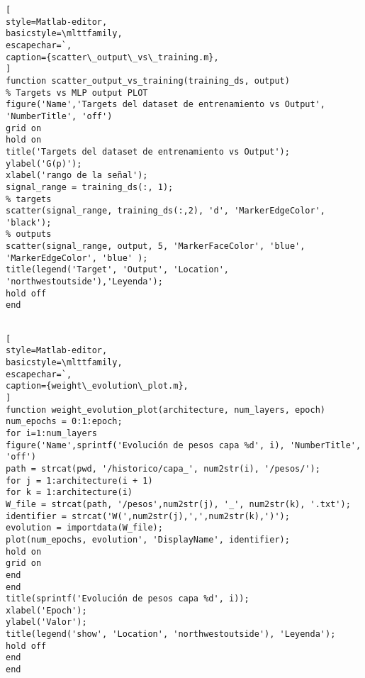 \documentclass[6pt]{article}
\begin{document}
\begin{lstlisting}[
style=Matlab-editor,
basicstyle=\mlttfamily,
escapechar=`,
caption={scatter\_output\_vs\_training.m},
]
function scatter_output_vs_training(training_ds, output)
% Targets vs MLP output PLOT
figure('Name','Targets del dataset de entrenamiento vs Output', 'NumberTitle', 'off')
grid on
hold on
title('Targets del dataset de entrenamiento vs Output');
ylabel('G(p)');
xlabel('rango de la señal');
signal_range = training_ds(:, 1);
% targets
scatter(signal_range, training_ds(:,2), 'd', 'MarkerEdgeColor', 'black');
% outputs
scatter(signal_range, output, 5, 'MarkerFaceColor', 'blue', 'MarkerEdgeColor', 'blue' ); 
title(legend('Target', 'Output', 'Location', 'northwestoutside'),'Leyenda');
hold off
end


\end{lstlisting}

\begin{lstlisting}[
style=Matlab-editor,
basicstyle=\mlttfamily,
escapechar=`,
caption={weight\_evolution\_plot.m},
]
function weight_evolution_plot(architecture, num_layers, epoch)
num_epochs = 0:1:epoch;
for i=1:num_layers
figure('Name',sprintf('Evolución de pesos capa %d', i), 'NumberTitle', 'off')
path = strcat(pwd, '/historico/capa_', num2str(i), '/pesos/');
for j = 1:architecture(i + 1)
for k = 1:architecture(i)
W_file = strcat(path, '/pesos',num2str(j), '_', num2str(k), '.txt');
identifier = strcat('W(',num2str(j),',',num2str(k),')');
evolution = importdata(W_file);
plot(num_epochs, evolution', 'DisplayName', identifier);
hold on
grid on
end
end
title(sprintf('Evolución de pesos capa %d', i));
xlabel('Epoch');
ylabel('Valor');
title(legend('show', 'Location', 'northwestoutside'), 'Leyenda');
hold off
end
end
\end{lstlisting}
\end{document}
